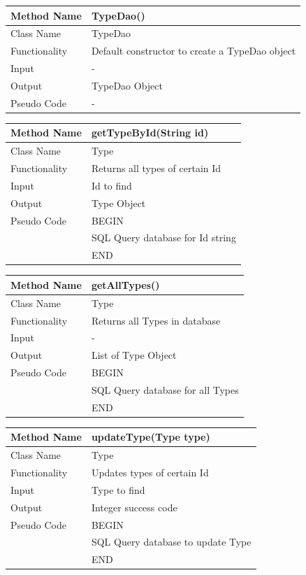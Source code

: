 \documentclass[12pt]{article}
\begin{document}
\begin{tabular}{ |p{3cm}||p{\colWidth}|  }
	\hline
	Method Name & TypeDao()\\
	\hline
	Class Name & TypeDao\\
	\hline
	Functionality & Default constructor to create a TypeDao object\\
	\hline
	Input & -\\
	\hline
	Output & TypeDao Object\\
	\hline
	Pseudo Code & -\\
	\hline
\end{tabular}            

\begin{tabular}{ |p{3cm}||p{\colWidth}|  }
	\hline
	Method Name &  getTypeById(String id)\\
	\hline
	Class Name & Type\\
	\hline
	Functionality & Returns all types of certain Id\\
	\hline
	Input & Id to find\\
	\hline
	Output & Type Object\\
	\hline
	Pseudo Code &BEGIN\\& SQL Query database for Id string\\&END\\
	\hline
\end{tabular}            

\begin{tabular}{ |p{3cm}||p{\colWidth}|  }
	\hline
	Method Name &  getAllTypes()\\
	\hline
	Class Name & Type\\
	\hline
	Functionality & Returns all Types in database\\
	\hline
	Input & -\\
	\hline
	Output & List of Type Object \\
	\hline
	Pseudo Code&BEGIN\\ & SQL Query database for all Types\\&END\\
	\hline
\end{tabular}    

\begin{tabular}{ |p{3cm}||p{\colWidth}|  }
	\hline
	Method Name &  updateType(Type type)\\
	\hline
	Class Name & Type\\
	\hline
	Functionality & Updates types of certain Id\\
	\hline
	Input & Type to find\\
	\hline
	Output & Integer success code\\
	\hline
	Pseudo Code&BEGIN\\ & SQL Query database to update Type\\&END\\
	\hline
\end{tabular}    
\end{document}
